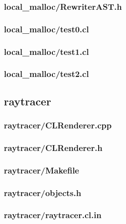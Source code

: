 \documentclass{article}
\begin{document}
\subsubsection*{local\_malloc/RewriterAST.h}


\subsubsection*{local\_malloc/test0.cl}


\subsubsection*{local\_malloc/test1.cl}


\subsubsection*{local\_malloc/test2.cl}


\subsection*{raytracer}
\subsubsection*{raytracer/CLRenderer.cpp}


\subsubsection*{raytracer/CLRenderer.h}


\subsubsection*{raytracer/Makefile}


\subsubsection*{raytracer/objects.h}


\subsubsection*{raytracer/raytracer.cl.in}

\end{document}
